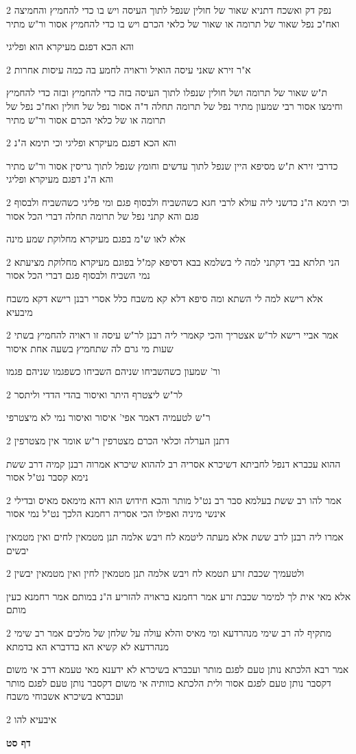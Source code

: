 \documentclass[12pt, openany]{book}
\newcommand{\sethebfont}{
\fontsize{10.5pt}{21.0pt} \selectfont
}
\newcommand{\twocol}[1]{
	{\sethebfont \begin{multicols}{2}
			#1
	\end{multicols}}	
}
\newcommand{\sectname}{}
\newcommand{\newsection}[1]{
	\addcontentsline{toc}{section}{#1}
	\renewcommand{\sectname}{#1}	
	\vspace{-\baselineskip}
	\begin{center}
		\textbf{%
\fontsize{16pt}{16pt}\selectfont
			#1}
	\end{center}
	\vspace{-\baselineskip}
	\nopagebreak
}
\begin{document}
\twocol{נפק דק ואשכח דתניא שאור של חולין שנפל לתוך העיסה ויש בו כדי להחמיץ והחמיצה ואח"כ נפל שאור של תרומה או שאור של כלאי הכרם ויש בו כדי להחמיץ אסור ור"ש מתיר
\par והא הכא דפגם מעיקרא הוא ופליגי}
\twocol{א"ר זירא שאני עיסה הואיל וראויה לחמע בה כמה עיסות אחרות
\par ת"ש שאור של תרומה ושל חולין שנפלו לתוך העיסה בזה כדי להחמיץ ובזה כדי להחמיץ וחימצו אסור רבי שמעון מתיר נפל של תרומה תחלה ד"ה אסור נפל של חולין ואח"כ נפל של תרומה או של כלאי הכרם אסור ור"ש מתיר}
\twocol{והא הכא דפגם מעיקרא ופליגי וכי תימא ה"נ
\par כדרבי זירא ת"ש מסיפא היין שנפל לתוך עדשים וחומץ שנפל לתוך גריסין אסור ור"ש מתיר והא ה"נ דפגם מעיקרא ופליגי}
\twocol{וכי תימא ה"נ כדשני ליה עולא לרבי חגא כשהשביח ולבסוף פגם ומי פליגי כשהשביח ולבסוף פגם והא קתני נפל של תרומה תחלה דברי הכל אסור
\par אלא לאו ש"מ בפגם מעיקרא מחלוקת שמע מינה}
\twocol{הני תלתא בבי דקתני למה לי בשלמא בבא דסיפא קמ"ל בפוגם מעיקרא מחלוקת מציעתא נמי השביח ולבסוף פגם דברי הכל אסור
\par אלא רישא למה לי השתא ומה סיפא דלא קא משבח כלל אסרי רבנן רישא דקא משבח מיבעיא}
\twocol{אמר אביי רישא לר"ש אצטריך והכי קאמרי ליה רבנן לר"ש עיסה זו ראויה להחמיץ בשתי שעות מי גרם לה שתחמיץ בשעה אחת איסור
\par ור' שמעון כשהשביחו שניהם השביחו כשפגמו שניהם פגמו}
\twocol{לר"ש ליצטרף היתר ואיסור בהדי הדדי וליתסר
\par ר"ש לטעמיה דאמר אפי' איסור ואיסור נמי לא מיצטרפי}
\twocol{דתנן הערלה וכלאי הכרם מצטרפין ר"ש אומר אין מצטרפין
\par ההוא עכברא דנפל לחביתא דשיכרא אסריה רב לההוא שיכרא אמרוה רבנן קמיה דרב ששת נימא קסבר נט"ל אסור}
\twocol{אמר להו רב ששת בעלמא סבר רב נט"ל מותר והכא חידוש הוא דהא מימאס מאיס ובדילי אינשי מיניה ואפילו הכי אסריה רחמנא הלכך נט"ל נמי אסור
\par אמרו ליה רבנן לרב ששת אלא מעתה ליטמא לח ויבש אלמה תנן מטמאין לחים ואין מטמאין יבשים}
\twocol{ולטעמיך שכבת זרע תטמא לח ויבש אלמה תנן מטמאין לחין ואין מטמאין יבשין
\par אלא מאי אית לך למימר שכבת זרע אמר רחמנא בראויה להזריע ה"נ במותם אמר רחמנא כעין מותם}
\twocol{מתקיף לה רב שימי מנהרדעא ומי מאיס והלא עולה על שלחן של מלכים אמר רב שימי מנהרדעא לא קשיא הא בדדברא הא בדמתא
\par אמר רבא הלכתא נותן טעם לפגם מותר ועכברא בשיכרא לא ידענא מאי טעמא דרב אי משום דקסבר נותן טעם לפגם אסור ולית הלכתא כוותיה אי משום דקסבר נותן טעם לפגם מותר ועכברא בשיכרא אשבוחי משבח}
\twocol{איבעיא להו}
\newsection{דף סט}
\end{document}
